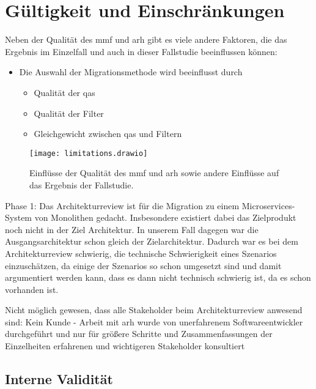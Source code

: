 \chapter{Gültigkeit und Einschränkungen}
\label{chap:gueltigkeit}

Neben der Qualität des \gls{mmf} und \gls{arh} gibt es viele andere Faktoren, die das Ergebnis im Einzelfall und auch in dieser Fallstudie beeinflussen können:

\begin{itemize}
	\item Die Auswahl der Migrationsmethode wird beeinflusst durch
	\begin{itemize}
		\item Qualität der \glspl{qa}
		\item Qualität der Filter
		\item Gleichgewicht zwischen \glspl{qa} und Filtern
	\end{itemize}
\end{itemize}

\begin{figure}
	\centering
	\texttt{[image: limitations.drawio]}
	\caption[Einflüsse auf das Ergebnis der Fallstudie]{
		Einflüsse der Qualität des \gls{mmf} und \gls{arh} sowie andere Einflüsse auf das Ergebnis der Fallstudie.
	}
	\label{fig:limitations}
\end{figure}

Phase 1:
Das Architekturreview ist für die Migration zu einem Microservices-System von Monolithen gedacht.
Insbesondere existiert dabei das Zielprodukt noch nicht in der Ziel Architektur. 
In unserem Fall dagegen war die Ausgangsarchitektur schon gleich der Zielarchitektur.
Dadurch war es bei dem Architekturreview schwierig, die technische Schwierigkeit eines Szenarios einzuschätzen, da einige der Szenarios so schon umgesetzt sind und damit argumentiert werden kann, dass es dann nicht technisch schwierig ist, da es schon vorhanden ist.

Nicht möglich gewesen, dass alle Stakeholder beim Architekturreview anwesend sind: Kein Kunde  
- Arbeit mit \gls{arh} wurde von unerfahrenem Softwareentwickler durchgeführt und nur für größere Schritte und Zusammenfassungen der Einzelheiten erfahrenen und wichtigeren Stakeholder konsultiert

\section{Interne Validität}

